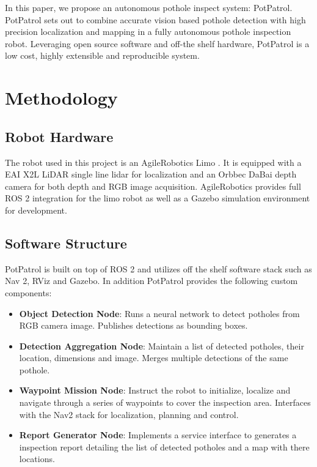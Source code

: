 \documentclass[conference]{IEEEtran}
\begin{document}
In this paper, we propose an autonomous pothole inspect system: PotPatrol. PotPatrol sets out to combine accurate vision based pothole detection with high precision localization and mapping in a fully autonomous pothole inspection robot. Leveraging open source software and off-the shelf hardware, PotPatrol is a low cost, highly extensible and reproducible system.

\section{Methodology}

\subsection{Robot Hardware}

The robot used in this project is an AgileRobotics Limo \cite{AgilexAi}. It is equipped with a EAI X2L LiDAR single line lidar \cite{YDLIDARX2_YDLIDARFocus} for localization and an Orbbec DaBai \cite{HomeORBBEC3D} depth camera for both depth and RGB image acquisition. AgileRobotics provides full ROS 2 integration for the limo robot as well as a Gazebo simulation environment for development.

\subsection{Software Structure}

PotPatrol is built on top of ROS 2 and utilizes off the shelf software stack such as Nav 2, RViz and Gazebo. In addition PotPatrol provides the following custom components:

\begin{itemize}
    \item \textbf{Object Detection Node}: Runs a neural network to detect potholes from RGB camera image. Publishes detections as bounding boxes.
    \item \textbf{Detection Aggregation Node}: Maintain a list of detected potholes, their location, dimensions and image. Merges multiple detections of the same pothole.
    \item \textbf{Waypoint Mission Node}: Instruct the robot to initialize, localize and navigate through a series of waypoints to cover the inspection area. Interfaces with the Nav2 stack for localization, planning and control.
    \item \textbf{Report Generator Node}: Implements a service interface to generates a inspection report detailing the list of detected potholes and a map with there locations.
\end{itemize}
\end{document}
